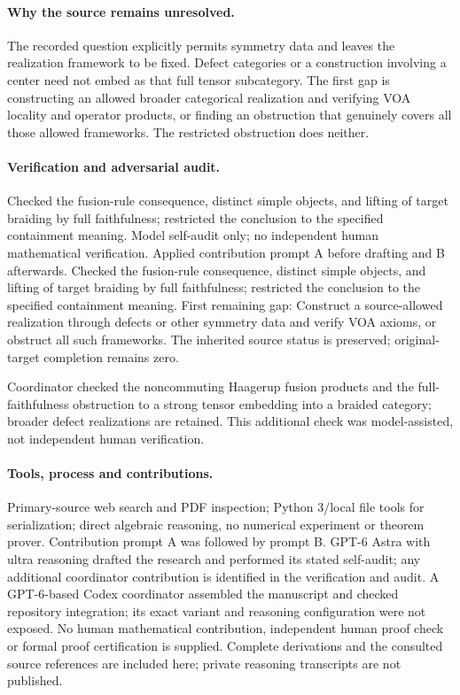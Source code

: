 \documentclass[11pt]{article}
\begin{document}
\paragraph{Why the source remains unresolved.} The recorded question explicitly permits symmetry data and leaves the realization framework to be fixed. Defect categories or a construction involving a center need not embed as that full tensor subcategory. The first gap is constructing an allowed broader categorical realization and verifying VOA locality and operator products, or finding an obstruction that genuinely covers all those allowed frameworks. The restricted obstruction does neither.

\paragraph{Verification and adversarial audit.}
Checked the fusion-rule consequence, distinct simple objects, and lifting of target braiding by full faithfulness; restricted the conclusion to the specified containment meaning. Model self-audit only; no independent human mathematical verification. Applied contribution prompt A before drafting and B afterwards. Checked the fusion-rule consequence, distinct simple objects, and lifting of target braiding by full faithfulness; restricted the conclusion to the specified containment meaning. First remaining gap: Construct a source-allowed realization through defects or other symmetry data and verify VOA axioms, or obstruct all such frameworks. The inherited source status is preserved; original-target completion remains zero.

Coordinator checked the noncommuting Haagerup fusion products and the full-faithfulness obstruction to a strong tensor embedding into a braided category; broader defect realizations are retained. This additional check was model-assisted, not independent human verification.

\paragraph{Tools, process and contributions.}
Primary-source web search and PDF inspection; Python 3/local file tools for serialization; direct algebraic reasoning, no numerical experiment or theorem prover. Contribution prompt A was followed by prompt B. GPT-6 Astra with ultra reasoning drafted the research and performed its stated self-audit; any additional coordinator contribution is identified in the verification and audit. A GPT-6-based Codex coordinator assembled the manuscript and checked repository integration; its exact variant and reasoning configuration were not exposed. No human mathematical contribution, independent human proof check or formal proof certification is supplied. Complete derivations and the consulted source references are included here; private reasoning transcripts are not published.
\end{document}
